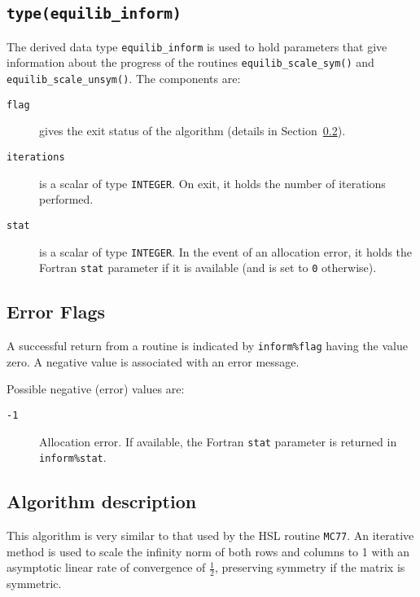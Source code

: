 \subsection{\texttt{type(equilib\_inform)}} \label{type:equilib_inform}

The derived data type \texttt{equilib\_inform} is used to hold parameters that
give information about the progress of the routines
\texttt{equilib\_scale\_sym()} and \texttt{equilib\_scale\_unsym()}. The components are:

\begin{description}

\item[\texttt{flag}] gives the exit status of the algorithm (details in Section~\ref{returns:equilib}).

\item[\texttt{iterations}] is a scalar of type \texttt{INTEGER}. On exit, it
   holds the number of iterations performed.

\item[\texttt{stat}] is a scalar of type \texttt{INTEGER}. In the event of an allocation error, it holds the Fortran \texttt{stat} parameter if it is available (and is set to \texttt{0} otherwise).

\end{description}

\subsection{Error Flags} \label{returns:equilib}
A successful return from a routine is indicated by \texttt{inform\%flag} having the value zero. A negative value is associated with an error message.

Possible negative (error) values are:
\begin{description}
\item[\texttt{-1}] Allocation error. If available, the Fortran \texttt{stat} parameter is returned in \texttt{inform\%stat}.
\end{description}

\subsection{Algorithm description}

This algorithm is very similar to that used by the HSL routine \texttt{MC77}.
An iterative method
is used to scale the infinity norm of both rows and columns to 1 with an asymptotic linear rate of convergence of $\frac{1}{2}$, preserving symmetry if the matrix is symmetric.

